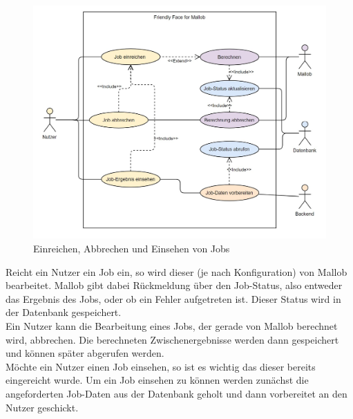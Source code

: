 \begin{figure}[H]
    \centering
    \includegraphics[width=\textwidth]{images-interface/Diagramme/Submit-abort-view-screenshot.jpg}
    \caption{Einreichen, Abbrechen und Einsehen von Jobs}
\end{figure}

Reicht ein \gls{Nutzer} ein Job ein, so wird dieser (je nach Konfiguration) von Mallob bearbeitet. Mallob gibt dabei Rückmeldung über den Job-Status, also entweder das Ergebnis des Jobs, oder ob ein Fehler aufgetreten ist. Dieser Status wird in der \gls{Datenbank} gespeichert. \\
Ein \gls{Nutzer} kann die Bearbeitung eines Jobs, der gerade von Mallob berechnet wird, abbrechen. Die berechneten Zwischenergebnisse werden dann gespeichert und können später abgerufen werden. \\
Möchte ein \gls{Nutzer} einen Job einsehen, so ist es wichtig das dieser bereits eingereicht wurde. Um ein Job einsehen zu können werden zunächst die angeforderten Job-Daten aus der \gls{Datenbank} geholt und dann vorbereitet an den \gls{Nutzer} geschickt.





